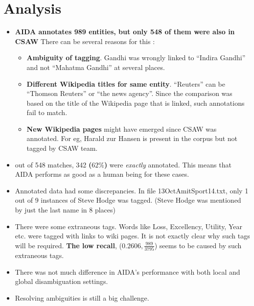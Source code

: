 \documentclass[a4paper,10pt]{article}
\begin{document}
\section{Analysis}
 \bigskip
 \begin{itemize}
  \item \textbf{AIDA annotates 989 entities, but only 548 of them were also in CSAW}
  There can be several reasons for this :
  \begin{itemize}
  \item  \textbf{Ambiguity of tagging}. Gandhi was wrongly linked to ``Indira Gandhi'' and not ``Mahatma Gandhi'' at several places. \medskip
  
  \item \textbf{Different Wikipedia titles for same entity}. ``Reuters'' can be ``Thomson Reuters'' or ``the news agency''. 
  Since the comparison was based on the title of the Wikipedia page that is linked, such annotations fail to match. \medskip
  \item  \textbf{New Wikipedia pages} might have emerged since CSAW was annotated. For eg, Harald zur Hansen is present in the corpus
  but not tagged by CSAW team. \medskip
  \end{itemize}
  
  \item out of 548 matches, 342 \textbf{($62\%$)} were \emph{exactly} annotated. This means that AIDA performs as good as a human being for these cases.
   \medskip
  
 \item Annotated data had some discrepancies. In file 13OctAmitSport14.txt, only 1 out of 9 instances of 
 Steve Hodge was tagged. (Steve Hodge was mentioned by just the last name in 8 places)
 \medskip
 \item There were some extraneous tags. Words like Loss, Excellency, Utility, Year etc. were tagged with links
 to wiki pages. It is not exactly clear why such tags will be required. \textbf{The low recall}, ($0.2606, \frac{989}{3795}$)
seems to be caused by such extraneous tags.
  \medskip
 \item There was not much difference in AIDA's performance with both local and global disambiguation settings.
  \medskip
 \item Resolving ambiguities is still a big challenge. 
 \medskip
 \end{itemize}
\end{document}
